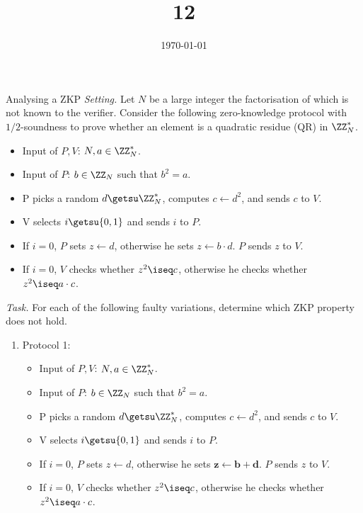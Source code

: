 \documentclass{practice}
\title{12}
\date{\today}
\begin{document}
\maketitle

\begin{task}{Analysing a ZKP}
  \textit{Setting.}
  Let $N$ be a large integer the factorisation of which is not known\footnotemark{} to the verifier. 
  Consider the following zero-knowledge protocol with $1/2$-soundness to prove whether an element is a quadratic residue (QR) in $\ZZ^*_N$.

  \begin{itemize}
    \item Input of $P, V$: $N, a\in\ZZ^*_N$.
    \item Input of $P$: $b\in\ZZ_N$ such that $b^2 = a$.
    \item P picks a random $d \getsu \ZZ^*_N$, computes $c \gets d^2$, and sends $c$ to $V$.
    \item V selects $i \getsu \{0,1\}$ and sends $i$ to $P$.
    \item If $i=0$, $P$ sets $z \gets d$, otherwise he sets $z \gets b \cdot d$. $P$ sends $z$ to $V$.
    \item If $i=0$, $V$ checks whether $z^2 \iseq c$, otherwise he checks whether $z^2 \iseq a \cdot c$.
  \end{itemize}

  \textit{Task.}
  For each of the following faulty variations, determine which ZKP property does not hold.
  \begin{enumerate}
    \item Protocol 1:
    \begin{itemize}
      \item Input of $P, V$: $N, a\in\ZZ^*_N$.
      \item Input of $P$: $b\in\ZZ_N$ such that $b^2 = a$.
      \item P picks a random $d \getsu \ZZ^*_N$, computes $c \gets d^2$, and sends $c$ to $V$.
      \item V selects $i \getsu \{0,1\}$ and sends $i$ to $P$.
      \item If $i=0$, $P$ sets $z \gets d$, otherwise he sets $\mathbf{z \gets b + d}$. $P$ sends $z$ to $V$.
      \item If $i=0$, $V$ checks whether $z^2 \iseq c$, otherwise he checks whether $z^2 \iseq a \cdot c$.
    \end{itemize}


\end{enumerate}
\end{task}
\end{document}
